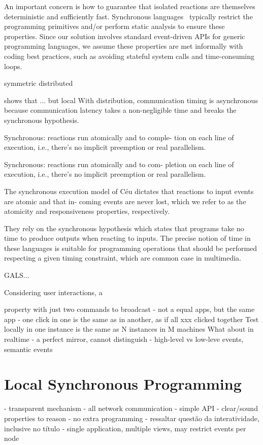 \documentclass[sigplan,screen]{acmart}
\begin{document}
An important concern is how to guarantee that isolated reactions are themselves
deterministic and sufficiently fast.
Synchronous languages~\cite{langs} typically restrict the programming
primitives and/or perform static analysis to ensure these properties.
Since our solution involves standard event-driven APIs for generic programming
languages, we assume these properties are met informally with coding best
practices, such as avoiding stateful system calls and time-consuming loops.

symmetric distributed

  shows that ... but local
With distribution, communication timing is asynchronous because communication
latency takes a non-negligible time and breaks the synchronous hypothesis.


Synchronous: reactions run atomically and to comple-
tion on each line of execution, i.e., there’s no implicit
preemption or real parallelism.

Synchronous: reactions run atomically and to com-
pletion on each line of execution, i.e., there’s no
implicit preemption or real parallelism.

The synchronous execution model of Céu dictates
that reactions to input events are atomic and that in-
coming events are never lost, which we refer to as the
atomicity and responsiveness properties, respectively.

They rely on
the synchronous hypothesis which states that programs take no time to produce
outputs when reacting to inputs. The precise notion of time in these languages
is suitable for programming operations that should be performed respecting a
given timing constraint, which are common case in multimedia.

GALS...

Considering user interactions, a

 property
 with just two commands
 to broadcast
%
- not a equal apps, but the same app
    - one click in one is the same as in another, as if all xxx clicked together
Test locally in one instance is the same as N instances in M machines
What about in realtime
- a perfect mirror, cannot distinguish
- high-level vs low-leve events, semantic events


\section{Local Synchronous Programming}
\label{sec.sync}

- transparent mechanism
- all network communication
- simple API
- clear/sound properties to reason
- no extra programming
- ressaltar questão da interatividade, inclusive no título
  - single application, multiple views, may restrict events per node
\end{document}
